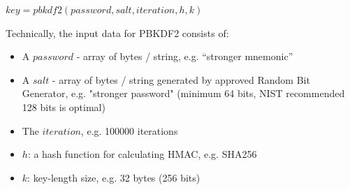 \vspace{0.2cm}
\begin{center}
  $key = pbkdf2(password, salt, iteration, h, k)$
\end{center}
\vspace{0.2cm}

Technically, the input data for PBKDF2 consists of:

\begin{itemize}
  \item A $password$ - array of bytes / string, e.g. “stronger mnemonic”
  \item A $salt$ - array of bytes / string generated by approved Random Bit Generator, e.g. "stronger password" (minimum 64 bits, NIST recommended 128 bits is optimal)
  \item The $iteration$, e.g. 100000 iterations
  \item $h$: a hash function for calculating HMAC, e.g. SHA256
  \item $k$: key-length size, e.g. 32 bytes (256 bits)
\end{itemize}



